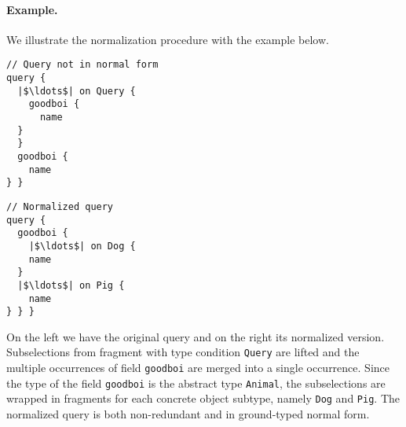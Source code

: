 \paragraph{Example.}  We illustrate the normalization procedure with
the example below.

\smallskip

\begin{minipage}[t]{.25\textwidth}
\begin{verbatim}
// Query not in normal form
query {
  |$\ldots$| on Query {
    goodboi {
      name
  }
  }
  goodboi {
    name
} }
\end{verbatim}
\end{minipage}%
\begin{minipage}[t]{.25\textwidth}
\begin{verbatim}
// Normalized query
query {
  goodboi {
    |$\ldots$| on Dog {
    name
  }
  |$\ldots$| on Pig {
    name
} } }
\end{verbatim} 
\end{minipage}

\medskip

\noindent On the left we have the original query and on the right its normalized
version. Subselections from fragment with type condition \texttt{Query} are lifted and the multiple occurrences of field \texttt{goodboi} are merged into a single occurrence. 
Since the type of the field \texttt{goodboi} is the abstract type \texttt{Animal}, the subselections are wrapped in fragments for each concrete object subtype, namely \texttt{Dog} and \texttt{Pig}. The normalized query is both non-redundant and in ground-typed normal form. 




\iffalse
\begin{minipage}[t]{.25\textwidth}
\begin{verbatim}
// Redundant query
query {
    goodboi {
        name
    }
    goodboi { 
 	name
    } 
}
\end{verbatim}
\end{minipage}%
\begin{minipage}[t]{.25\textwidth}
\begin{verbatim}

// Normalized query
query {
    goodboi {
        |$\ldots$| on Dog {
	    name
	}
	|$\ldots$| on Pig {
	    name
	}
    }	
}
\end{verbatim} 
\end{minipage}
\fi

